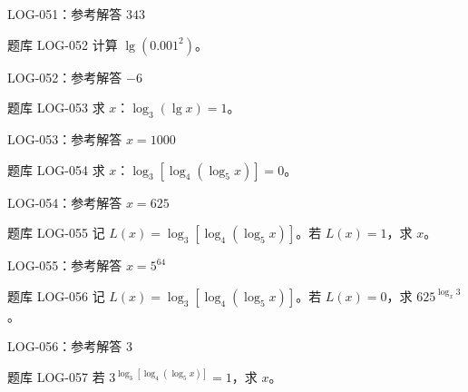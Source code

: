 \documentclass[aspectratio=169,10pt]{beamer}
\begin{document}
\ifdefined\TeacherEdition
\begin{frame}[t]{LOG-051：参考解答}
$343$
\end{frame}
\fi

\begin{campuspractice}{题库 LOG-052}
计算 $\lg(0.001^2)$。
\end{campuspractice}

\ifdefined\TeacherEdition
\begin{frame}[t]{LOG-052：参考解答}
$-6$
\end{frame}
\fi

\begin{campuspractice}{题库 LOG-053}
求 $x$：$\log_3(\lg x)=1$。
\end{campuspractice}

\ifdefined\TeacherEdition
\begin{frame}[t]{LOG-053：参考解答}
$x=1000$
\end{frame}
\fi

\begin{campuspractice}{题库 LOG-054}
求 $x$：$\log_3[\log_4(\log_5x)]=0$。
\end{campuspractice}

\ifdefined\TeacherEdition
\begin{frame}[t]{LOG-054：参考解答}
$x=625$
\end{frame}
\fi

\begin{campuspractice}{题库 LOG-055}
记 $L(x)=\log_3[\log_4(\log_5x)]$。若 $L(x)=1$，求 $x$。
\end{campuspractice}

\ifdefined\TeacherEdition
\begin{frame}[t]{LOG-055：参考解答}
$x=5^{64}$
\end{frame}
\fi

\begin{campuspractice}{题库 LOG-056}
记 $L(x)=\log_3[\log_4(\log_5x)]$。若 $L(x)=0$，求 $625^{\log_x3}$。
\end{campuspractice}

\ifdefined\TeacherEdition
\begin{frame}[t]{LOG-056：参考解答}
$3$
\end{frame}
\fi

\begin{campuspractice}{题库 LOG-057}
若 $3^{\log_3[\log_4(\log_5x)]}=1$，求 $x$。
\end{campuspractice}
\end{document}

